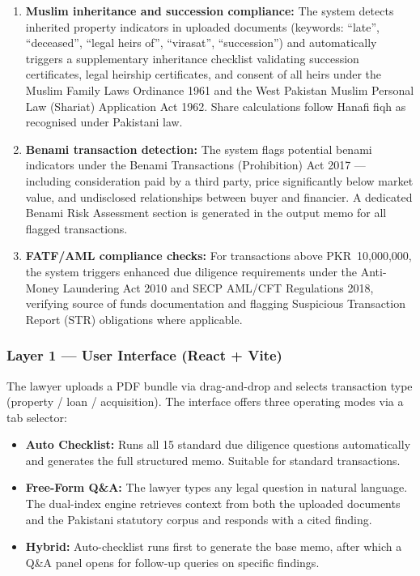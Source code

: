\documentclass[12pt, a4paper]{article}
\begin{document}
\begin{enumerate}[leftmargin=1.5cm]
    \item \textbf{Muslim inheritance and succession compliance:} The
    system detects inherited property indicators in uploaded documents
    (keywords: ``late'', ``deceased'', ``legal heirs of'', ``virasat'',
    ``succession'') and automatically triggers a supplementary
    inheritance checklist validating succession certificates, legal
    heirship certificates, and consent of all heirs under the Muslim
    Family Laws Ordinance 1961 and the West Pakistan Muslim Personal
    Law (Shariat) Application Act 1962. Share calculations follow
    Hanafi fiqh as recognised under Pakistani law.

    \item \textbf{Benami transaction detection:} The system flags
    potential benami indicators under the Benami Transactions
    (Prohibition) Act 2017 --- including consideration paid by a
    third party, price significantly below market value, and
    undisclosed relationships between buyer and financier. A
    dedicated Benami Risk Assessment section is generated in the
    output memo for all flagged transactions.

    \item \textbf{FATF/AML compliance checks:} For transactions above
    PKR~10,000,000, the system triggers enhanced due diligence
    requirements under the Anti-Money Laundering Act 2010 and SECP
    AML/CFT Regulations 2018, verifying source of funds documentation
    and flagging Suspicious Transaction Report (STR) obligations where
    applicable.
\end{enumerate}

\subsubsection{Layer 1 --- User Interface (React + Vite)}
The lawyer uploads a PDF bundle via drag-and-drop and selects transaction type
(property / loan / acquisition). The interface offers three operating modes via
a tab selector:

\begin{itemize}[leftmargin=1.5cm]
    \item \textbf{Auto Checklist:} Runs all 15 standard due diligence questions
    automatically and generates the full structured memo. Suitable for standard
    transactions.
    \item \textbf{Free-Form Q\&A:} The lawyer types any legal question in natural
    language. The dual-index engine retrieves context from both the uploaded
    documents and the Pakistani statutory corpus and responds with a cited finding.
    \item \textbf{Hybrid:} Auto-checklist runs first to generate the base memo,
    after which a Q\&A panel opens for follow-up queries on specific findings.
\end{itemize}
\end{document}
